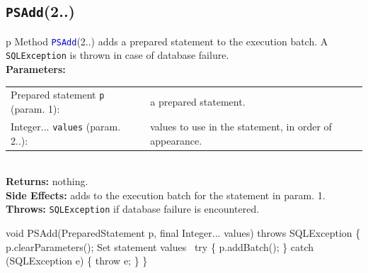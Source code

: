 \subsection{\texttt{PSAdd}(2..)}
\begin{tabular}{p{\textwidth}}
\toprule
{}
Method \textcolor{blue}{{\tt{}\protect{}PSAdd}}(2..) adds a prepared statement to
the execution batch.
A {\tt{}SQLException} is thrown in case of database failure.\\
\midrule
\textbf{Parameters:} \\
\begin{tabular}{lp{116mm}}
Prepared statement {\tt{}p} (param. 1):&a prepared statement.\\
Integer... {\tt{}values} (param. 2..):&values to use in the statement, in order of appearance.\\
\end{tabular}\\
\textbf{Returns:} nothing.\\
\textbf{Side Effects:} adds to the execution batch for the statement in param. 1.\\
\textbf{Throws:} {\tt{}SQLException} if database failure is encountered.\\
\bottomrule
\end{tabular}
\nwenddocs{}\endmoddef{}
void PSAdd(PreparedStatement p, final Integer... values) throws SQLException \{
  p.clearParameters();
  \LA{}Set statement values~{\nwtagstyle{}}\RA{}
  try \{
    p.addBatch();
  \} catch (SQLException e) \{
    throw e;
  \}
\}
\eatline
{}\nwendcode{}\nwdocspar
